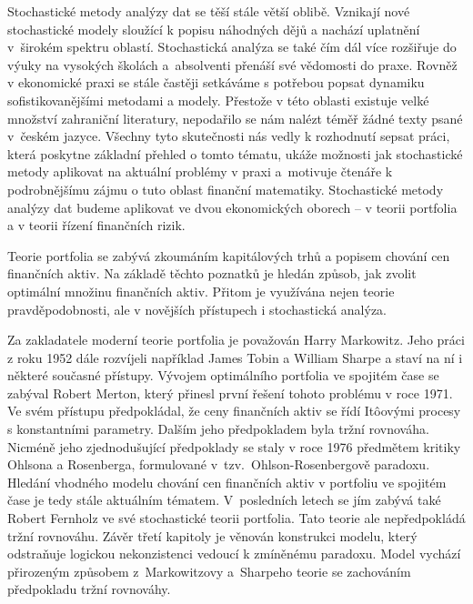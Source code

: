 \documentclass[a4paper,12pt]{report}
\theoremstyle{definition} \newtheorem{definice}[veta]{Definice}
\theoremstyle{remark}
\begin{document}

Stochastické metody analýzy dat se těší stále větší oblibě.
Vznikají nové stochastické modely sloužící k popisu náhodných dějů a nachází uplatnění v~širokém spektru oblastí.
Stochastická analýza se také čím dál více rozšiřuje do výuky na vysokých školách a~absolventi přenáší své vědomosti do praxe.
Rovněž v ekonomické praxi se stále častěji setkáváme s potřebou popsat dynamiku sofistikovanějšími metodami a modely.
Přestože v této oblasti existuje velké množství zahraniční literatury, nepodařilo se nám nalézt téměř žádné texty psané v~českém jazyce.
Všechny tyto skutečnosti nás vedly k rozhodnutí sepsat práci, která poskytne základní přehled o tomto tématu, ukáže možnosti jak stochastické metody aplikovat na aktuální problémy v praxi a~motivuje čtenáře k podrobnějšímu zájmu o tuto oblast finanční matematiky.
Stochastické metody analýzy dat budeme aplikovat ve dvou ekonomických oborech -- v teorii portfolia a v teorii řízení finančních rizik. 

Teorie portfolia se zabývá zkoumáním kapitálových trhů a popisem chování cen finančních aktiv.
Na základě těchto poznatků je hledán způsob, jak zvolit optimální množinu finančních aktiv.
Přitom je využívána nejen teorie pravděpodobnosti, ale v novějších přístupech i stochastická analýza.

Za zakladatele moderní teorie portfolia je považován Harry Markowitz. 
Jeho práci z roku 1952 dále rozvíjeli například James Tobin a William Sharpe a staví na ní i některé současné přístupy.
%
%
Vývojem optimálního portfolia ve spojitém čase se zabýval Robert Merton, který přinesl první řešení tohoto problému v roce 1971.
Ve svém přístupu předpokládal, že ceny finančních aktiv se řídí It\^oovými procesy s konstantními parametry. 
Dalším jeho předpokladem byla tržní rovnováha.
%
Nicméně jeho zjednodušující předpoklady se staly v roce 1976 předmětem kritiky Ohlsona a Rosenberga, formulované v~tzv.~Ohlson-Rosenbergově paradoxu.
Hledání vhodného modelu chování cen finančních aktiv v portfoliu ve spojitém čase je tedy stále aktuálním tématem. 
V~posledních letech se jím zabývá také Robert Fernholz ve své stochastické teorii portfolia. 
Tato teorie ale nepředpokládá tržní rovnováhu.
Závěr třetí kapitoly je věnován konstrukci modelu, který odstraňuje logickou nekonzistenci vedoucí k zmíněnému paradoxu. 
Model vychází přirozeným způsobem z~Markowitzovy a~Sharpeho teorie se zachováním předpokladu tržní rovnováhy.
\end{document}
